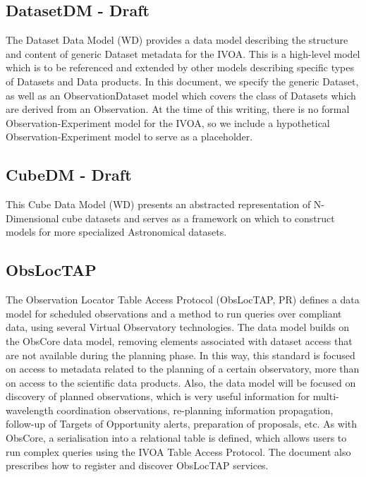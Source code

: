 \documentclass[11pt,a4paper]{ivoa}
\begin{document}
\subsection{DatasetDM - Draft}

The Dataset Data Model (WD) provides a data model describing the structure and content of generic 
Dataset metadata for the IVOA. This is a high-level model which is to be referenced and 
extended by other models describing specific types of Datasets and Data products. In 
this document, we specify the generic Dataset, as well as an ObservationDataset model 
which covers the class of Datasets which are derived from an Observation. At the time of 
this writing, there is no formal Observation-Experiment model for the IVOA, so we include 
a hypothetical Observation-Experiment model to serve as a placeholder. 

\subsection{CubeDM - Draft}

This Cube Data Model (WD) presents an abstracted representation of N-Dimensional cube datasets and 
serves as a framework on which to construct models for more specialized Astronomical datasets. 

\subsection{ObsLocTAP} 

The Observation Locator Table Access Protocol (ObsLocTAP, PR) defines a data model for scheduled observations 
and a method to run queries over compliant data, using several Virtual Observatory technologies.
The data model builds on the ObsCore data model, removing elements associated with dataset 
access that are not available during the planning phase. In this way, this standard is focused 
on access to metadata related to the planning of a certain observatory, more than on access to 
the scientific data products. Also, the data model will be focused on discovery of planned 
observations, which is very useful information for multi-wavelength coordination observations, 
re-planning information propagation, follow-up of Targets of Opportunity alerts, preparation 
of proposals, etc. As with ObsCore, a serialisation into a relational table is defined, which 
allows users to run complex queries using the IVOA Table Access Protocol. The document also 
prescribes how to register and discover ObsLocTAP services. 
\end{document}
